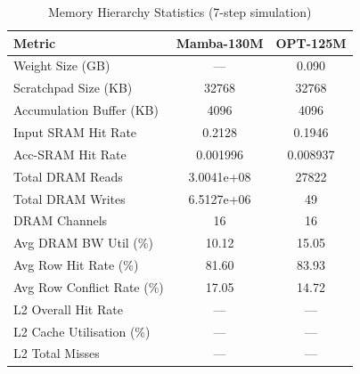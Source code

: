 \begin{table}[h]\centering
    \caption{Memory Hierarchy Statistics (7-step simulation)}
    \label{tab:memory_stats_gen}
    \begin{tabular}{lcc}\hline
    Metric & Mamba-130M & OPT-125M \\\hline
            Weight Size (GB) & --- & 0.090 \\
        Scratchpad Size (KB) & 32768 & 32768 \\
        Accumulation Buffer (KB) & 4096 & 4096 \\
        Input SRAM Hit Rate & 0.2128 & 0.1946 \\
        Acc-SRAM Hit Rate & 0.001996 & 0.008937 \\
        Total DRAM Reads & 3.0041e+08 & 27822 \\
        Total DRAM Writes & 6.5127e+06 & 49 \\
        DRAM Channels & 16 & 16 \\
        Avg DRAM BW Util (\%) & 10.12 & 15.05 \\
        Avg Row Hit Rate (\%) & 81.60 & 83.93 \\
        Avg Row Conflict Rate (\%) & 17.05 & 14.72 \\
        L2 Overall Hit Rate & --- & --- \\
        L2 Cache Utilisation (\%) & --- & --- \\
        L2 Total Misses & --- & --- \\
\hline\end{tabular}\end{table}